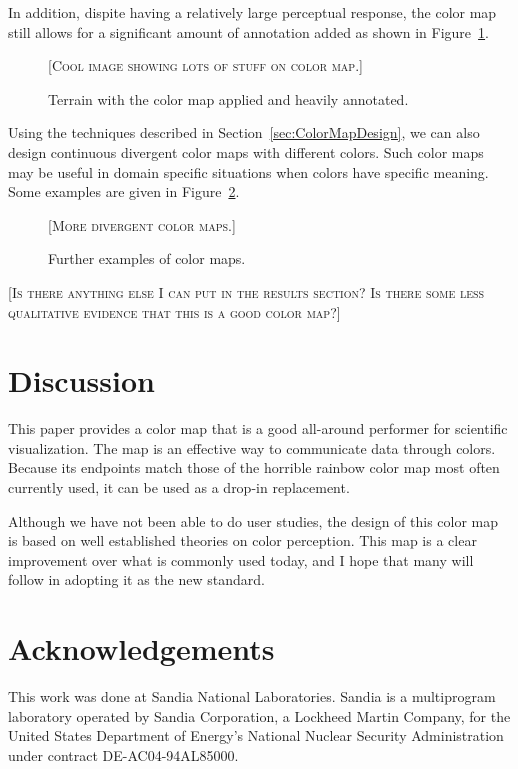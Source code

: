 \documentclass[twocolumn]{article}
\newcommand{\sticky}[1]{\textsc{[#1]}}
\begin{document}
In addition, dispite having a relatively large perceptual response, the
color map still allows for a significant amount of annotation added as
shown in Figure~\ref{fig:ColorMapWithAnnotation}.

\begin{figure}
  \centering
  \sticky{Cool image showing lots of stuff on color map.}
  \caption{Terrain with the color map applied and heavily annotated.}
  \label{fig:ColorMapWithAnnotation}
\end{figure}

Using the techniques described in Section~\ref{sec:ColorMapDesign}, we can
also design continuous divergent color maps with different colors.  Such
color maps may be useful in domain specific situations when colors have
specific meaning.  Some examples are given in
Figure~\ref{fig:OtherColorMaps}.

\begin{figure}
  \centering
  \sticky{More divergent color maps.}
  \caption{Further examples of color maps.}
  \label{fig:OtherColorMaps}
\end{figure}

\sticky{Is there anything else I can put in the results section?  Is there
  some less qualitative evidence that this is a good color map?}


\section{Discussion}
\label{sec:Discussion}

This paper provides a color map that is a good all-around performer for
scientific visualization.  The map is an effective way to communicate data
through colors.  Because its endpoints match those of the horrible rainbow
color map most often currently used, it can be used as a drop-in
replacement.

Although we have not been able to do user studies, the design of this color
map is based on well established theories on color perception.  This map is
a clear improvement over what is commonly used today, and I hope that many
will follow in adopting it as the new standard.


\section{Acknowledgements}

This work was done at Sandia National Laboratories.  Sandia is a
multiprogram laboratory operated by Sandia Corporation, a Lockheed Martin
Company, for the United States Department of Energy's National Nuclear
Security Administration under contract DE-AC04-94AL85000.



\end{document}
